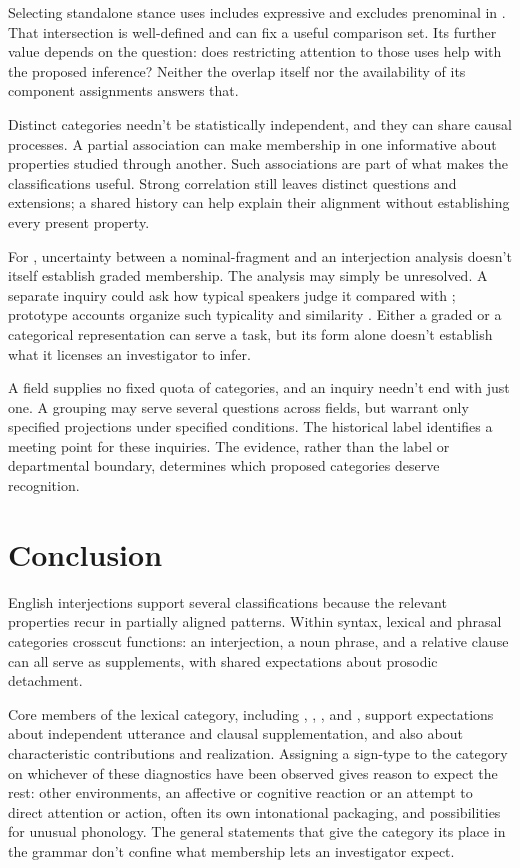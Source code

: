 \documentclass[12pt]{article}
\begin{document}
Selecting standalone stance uses includes expressive 
and excludes prenominal  in . That
intersection is well-defined and can fix a useful comparison set.
Its further value depends on the question: does restricting attention
to those uses help with the proposed inference? Neither the overlap
itself nor the availability of its component assignments answers that.

Distinct categories needn't be statistically independent, and they can
share causal processes. A partial association can make membership in
one informative about properties studied through another. Such associations
are part of what makes the classifications useful. Strong correlation
still leaves distinct questions and extensions; a shared history can
help explain their alignment without establishing every present property.

For , uncertainty between a nominal-fragment and an
interjection analysis doesn't itself establish graded membership. The
analysis may simply be unresolved. A separate inquiry could ask how
typical speakers judge it compared with ; prototype
accounts organize such typicality and similarity \citep{rosch1975,taylor2003}.
Either a graded or a categorical representation can serve a task,
but its form alone doesn't establish what it licenses an investigator
to infer.

A field supplies no fixed quota of categories, and an inquiry
needn't end with just one. A grouping may serve several questions across
fields, but warrant only specified projections under specified conditions.
The historical label  identifies a meeting point for
these inquiries. The evidence, rather than the label or departmental
boundary, determines which proposed categories deserve recognition.

\section{Conclusion}\label{sec:conclusion}

English interjections support several classifications because the relevant
properties recur in partially aligned patterns. Within syntax, lexical
and phrasal categories crosscut functions: an interjection, a noun phrase,
and a relative clause can all serve as supplements, with shared
expectations about prosodic detachment.

Core members of the lexical category, including ,
, , and , support expectations
about independent utterance and clausal supplementation, and also about
characteristic contributions and realization. Assigning a sign-type to the
category on whichever of these diagnostics have been observed gives reason
to expect the rest: other environments, an affective or cognitive reaction
or an attempt to direct attention or action, often its own intonational
packaging, and possibilities for unusual phonology.
The general statements that give the category its place in the grammar
don't confine what membership lets an investigator expect.
\end{document}
